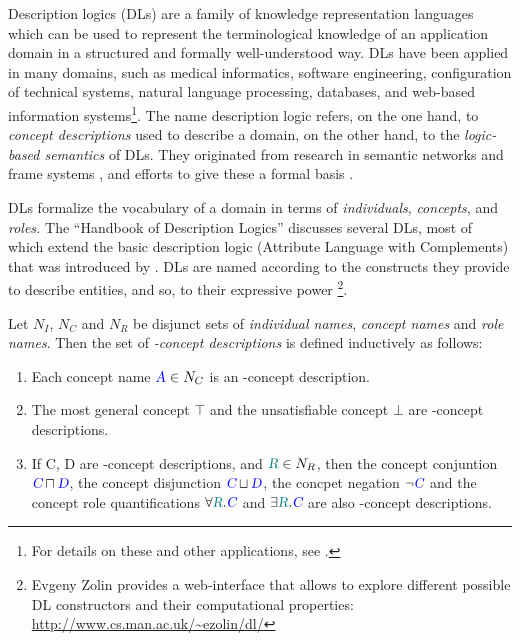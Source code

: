 Description logics (DLs) are a family of knowledge representation
languages which can be used to represent the terminological
knowledge of an application domain in a structured and formally
well-understood way. DLs have been applied in many domains, such as
medical informatics, software engineering, configuration of
technical systems, natural language processing, databases, and
web-based information systems\footnote{For details on these and
other applications, see \cite[Part 3]{BaaderEA2003DLHandbook}. }.
The name description logic refers, on the one hand, to \emph{concept descriptions}
used to describe a domain,
on the other hand, to the \emph{logic-based semantics} of DLs.  They
originated from research in semantic networks
\citep{Quillian1967WordConcepts} and frame systems
\citep{Minsky1981Frame}, and efforts to give these a formal basis
\citep{Woods1975WhatsInALink,Brachman1977WhatsInAConcept,Hayes1977InDefenseOfLogic,Hayes1979FramesLogic}.


DL{}s formalize the vocabulary of a domain in terms of \emph{individuals}, \emph{concepts}, and \emph{roles.}  The ``Handbook of Description Logics'' \citep{BaaderEA2003DLHandbook} discusses several DLs, most of which extend the basic description logic \ALC (Attribute Language with Complements) that was introduced by \cite{SchmidtSchaussSmolka1991ALC}. DLs are named according to the constructs they provide to describe entities, and so, to their expressive power
\citep{SchmidtSchaussSmolka1991ALC}\footnote{ Evgeny Zolin provides a web-interface that allows to explore different possible DL constructors and their computational properties: \url{http://www.cs.man.ac.uk/~ezolin/dl/} }.


\begin{definition}
\index{\ALC}
Let $N_I$, $N_C$ and $N_R$ be disjunct sets of \emph{individual names}, \emph{concept names} and \emph{role names}.
 Then the set of \emph{\ALC-concept descriptions} is defined inductively as follows:

\begin{enumerate}
\item Each concept name ${\textcolor{blue}{\textsl{A}}}\in N_C$ is an \ALC-concept description.
\item The most general concept $\top$ and the unsatisfiable concept $\bot$ are \ALC-concept descriptions.
\item If \DLConVar C, \DLConVar D are \ALC-concept descriptions, and $\DLRolVar{R}\in N_R$, then  the concept conjuntion ${\textcolor{blue}{\textsl{C}}} \sqcap {\ensuremath{\textcolor{blue}{\textsl{D}}}}$, the concept disjunction ${\textcolor{blue}{\textsl{C}}} \sqcup {\ensuremath{\textcolor{blue}{\textsl{D}}}}$, the concpet negation $\neg{\ensuremath{\textcolor{blue}{\textsl{C}}}}$ and the concept role quantifications
$\forall\DLRolVar{R}.\DLConVar C$ and $\exists\DLRolVar{R}.\DLConVar C$ are also \ALC-concept descriptions.
\end{enumerate}
\end{definition}

